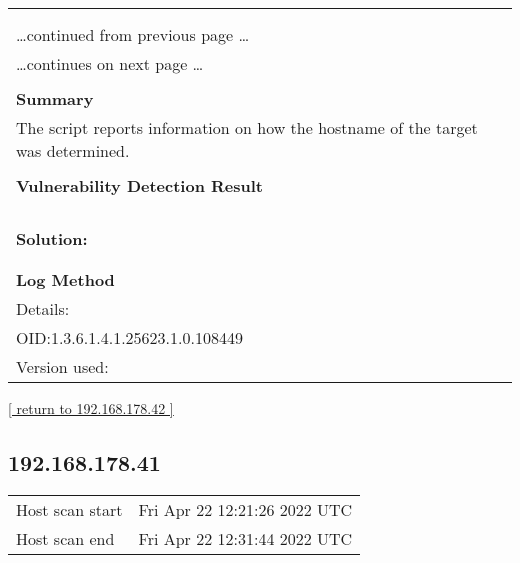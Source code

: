 \documentclass{article}
\begin{document}
\begin{longtable}{|p{}|}
\hline
\rowcolor{gvm_log}{\color{white}{Log (CVSS: 0.0) }}\\
\rowcolor{gvm_log}{\color{white}{NVT: Hostname Determination Reporting}}\\
\hline
\endfirsthead
\hfill\ldots continued from previous page \ldots \\
\hline
\endhead
\hline
\ldots continues on next page \ldots \\
\endfoot
\hline
\endlastfoot
\\
\textbf{Summary}\\
The script reports information on how the hostname
  of the target was determined.\\

        \hline
        \\
\textbf{Vulnerability Detection Result}\\
\rowcolor{white}{\verb=Hostname determination for IP 192.168.178.42:=}\\
\rowcolor{white}{\verb=Hostname|Source=}\\
\rowcolor{white}{\verb=nasale.fritz.box|Reverse-DNS=}\\

          \hline
          \\
\textbf{Solution:}\\
\\


        \hline
        \\
\textbf{Log Method}\\
Details:
\rowcolor{white}{\verb=Hostname Determination Reporting=}\\
OID:1.3.6.1.4.1.25623.1.0.108449\\
Version used:
\rowcolor{white}{\verb=2018-11-19T11:11:31Z=}\\
\end{longtable}

\begin{footnotesize}\hyperref[host:192.168.178.42]{[ return to 192.168.178.42 ]}\end{footnotesize}
\subsection{192.168.178.41}
\label{host:192.168.178.41}

\begin{tabular}{ll}
Host scan start&Fri Apr 22 12:21:26 2022 UTC\\
Host scan end&Fri Apr 22 12:31:44 2022 UTC\\
\end{tabular}
\end{document}
